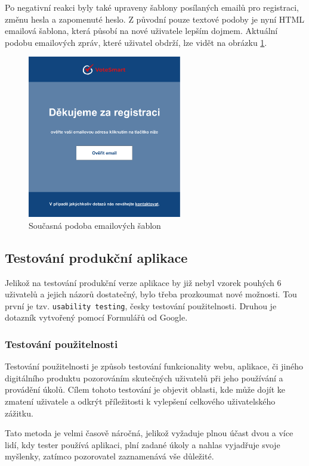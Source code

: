 \par Po negativní reakci byly také upraveny šablony posílaných emailů pro registraci, změnu hesla a zapomenuté heslo. Z původní pouze textové podoby je nyní HTML emailová šablona, která působí na nové uživatele lepším dojmem. Aktuální podobu emailových zpráv, které uživatel obdrží, lze vidět na obrázku \ref{fig:graphic-email}.

\begin{figure}
    \centering
    \includegraphics[width=0.6\textwidth]{obrazky-figures/Email.pdf}
    \caption{Současná podoba emailových šablon}
    \label{fig:graphic-email}
\end{figure}

\subsection{Testování produkční aplikace}
Jelikož na testování produkční verze aplikace by již nebyl vzorek pouhých 6 uživatelů a jejich názorů dostatečný, bylo třeba prozkoumat nové možnosti. Tou první je tzv. \texttt{usability testing}, česky testování použitelnosti. Druhou je dotazník vytvořený pomocí Formulářů od Google.

\subsubsection{Testování použitelnosti}
Testování použitelnosti je způsob testování funkcionality webu, aplikace, či jiného digitálního produktu pozorováním skutečných uživatelů při jeho používání a provádění úkolů. Cílem tohoto testování je objevit oblasti, kde může dojít ke zmatení uživatele a odkrýt příležitosti k vylepšení celkového uživatelského zážitku\cite{hotjar-usability-testing}. 
\par Tato metoda je velmi časově náročná, jelikož vyžaduje plnou účast dvou a více lidí, kdy tester používá aplikaci, plní zadané úkoly a nahlas vyjadřuje svoje myšlenky, zatímco pozorovatel zaznamenává vše důležité.

